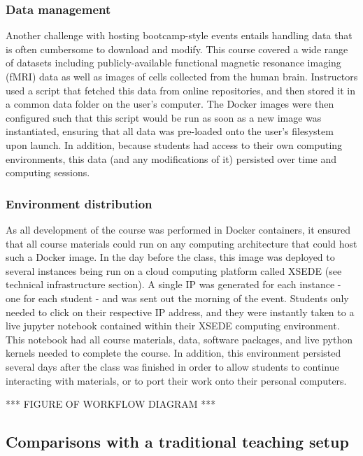 \subsubsection{Data management}

Another challenge with hosting bootcamp-style events entails handling data that
is often cumbersome to download and modify. This course covered a wide range of
datasets including publicly-available functional magnetic resonance imaging
(fMRI) data as well as images of cells collected from the human brain.
Instructors used a script that fetched this data from online repositories, and
then stored it in a common data folder on the user's computer. The Docker images
were then configured such that this script would be run as soon as a new image
was instantiated, ensuring that all data was pre-loaded onto the user's
filesystem upon launch. In addition, because students had access to their own
computing environments, this data (and any modifications of it) persisted over
time and computing sessions.

\subsubsection{Environment distribution}

As all development of the course was performed in Docker containers, it ensured
that all course materials could run on any computing architecture that could
host such a Docker image. In the day before the class, this image was deployed
to several instances being run on a cloud computing platform called XSEDE (see
technical infrastructure section). A single IP was generated for each instance -
one for each student - and was sent out the morning of the event. Students only
needed to click on their respective IP address, and they were instantly taken to
a live jupyter notebook contained within their XSEDE computing environment. This
notebook had all course materials, data, software packages, and live python
kernels needed to complete the course. In addition, this environment persisted
several days after the class was finished in order to allow students to continue
interacting with materials, or to port their work onto their personal computers.

*** FIGURE OF WORKFLOW DIAGRAM ***

\subsection{Comparisons with a traditional teaching setup}

